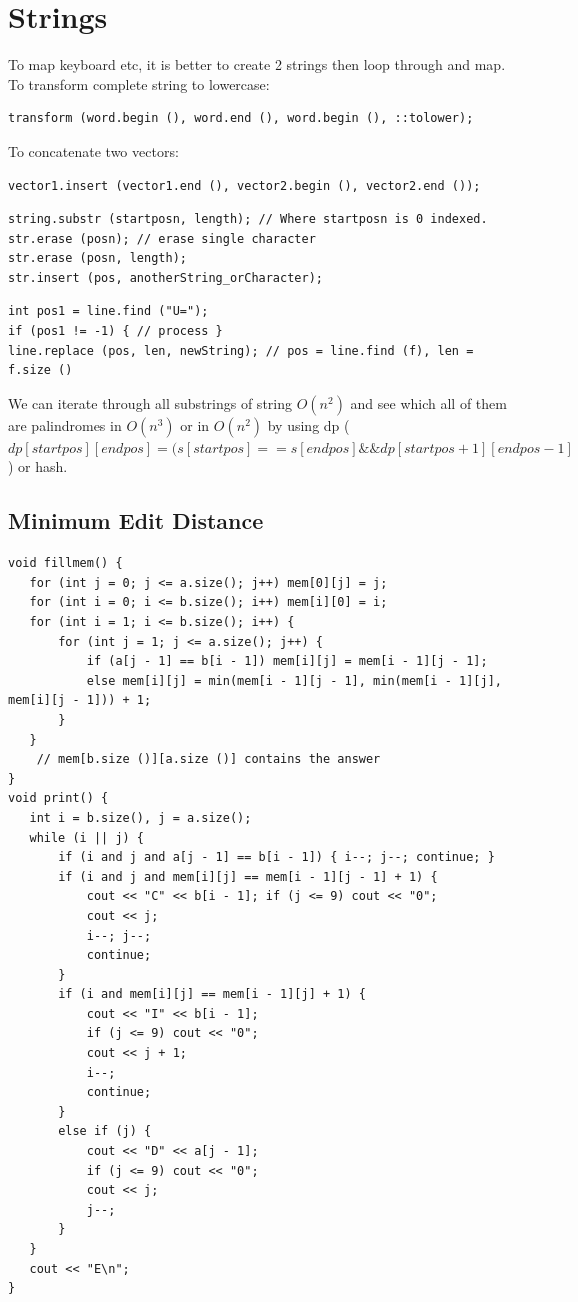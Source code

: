 \documentclass[8pt, a4paper, oneside, twocolumn]{extarticle}
\begin{document}
\section{Strings}
To map keyboard etc, it is better to create 2 strings then loop through and map.\\
To transform complete string to lowercase: 
\begin{verbatim} 
transform (word.begin (), word.end (), word.begin (), ::tolower); 
\end{verbatim}
To concatenate two vectors: 
\begin{verbatim}
vector1.insert (vector1.end (), vector2.begin (), vector2.end ()); 
\end{verbatim}
\begin{verbatim} 
string.substr (startposn, length); // Where startposn is 0 indexed.
str.erase (posn); // erase single character
str.erase (posn, length);
str.insert (pos, anotherString_orCharacter);

\end{verbatim}
\begin{verbatim}
int pos1 = line.find ("U=");
if (pos1 != -1) { // process }  
line.replace (pos, len, newString); // pos = line.find (f), len = f.size ()
\end{verbatim}
We can iterate through all substrings of string $O(n^2)$ and see which all of them are palindromes in $O(n^3)$ or in $O(n^2)$ by using dp ($dp[startpos][endpos] = (s[startpos] == s[endpos] \&\& dp[startpos + 1][endpos - 1]$) or hash.
\subsection{Minimum Edit Distance}
\begin{verbatim}
void fillmem() {
   for (int j = 0; j <= a.size(); j++) mem[0][j] = j;
   for (int i = 0; i <= b.size(); i++) mem[i][0] = i;
   for (int i = 1; i <= b.size(); i++) {
       for (int j = 1; j <= a.size(); j++) {
           if (a[j - 1] == b[i - 1]) mem[i][j] = mem[i - 1][j - 1];
           else mem[i][j] = min(mem[i - 1][j - 1], min(mem[i - 1][j], mem[i][j - 1])) + 1;
       }
   }
    // mem[b.size ()][a.size ()] contains the answer
}
void print() {
   int i = b.size(), j = a.size();
   while (i || j) {
       if (i and j and a[j - 1] == b[i - 1]) { i--; j--; continue; }
       if (i and j and mem[i][j] == mem[i - 1][j - 1] + 1) {
           cout << "C" << b[i - 1]; if (j <= 9) cout << "0";
           cout << j;
           i--; j--;
           continue;
       }
       if (i and mem[i][j] == mem[i - 1][j] + 1) {
           cout << "I" << b[i - 1];
           if (j <= 9) cout << "0";
           cout << j + 1;
           i--;
           continue;
       }
       else if (j) {
           cout << "D" << a[j - 1];
           if (j <= 9) cout << "0";
           cout << j;
           j--;
       }
   }
   cout << "E\n";
}
\end{verbatim}
\end{document}
